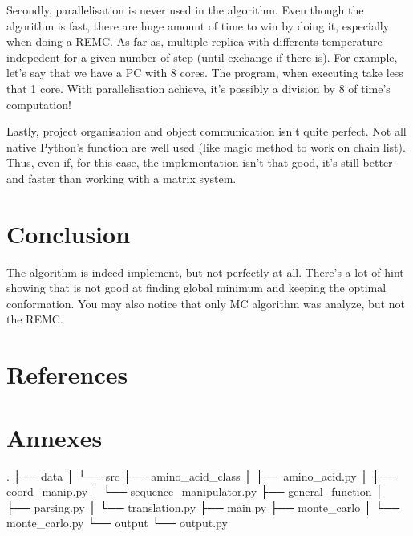 \documentclass[12pt, oneside, a4paper]{report}
\begin{document}
\begin{multicols}{2}
Secondly, parallelisation is never used in the algorithm. Even though the algorithm is fast, there are huge amount of time to win by doing it, especially when doing a REMC. As far as, multiple replica with differents temperature indepedent for a given number of step (until exchange if there is). For example, let's say that we have a PC with 8 cores. The program, when executing take less that 1 core. With parallelisation achieve, it's possibly a division by 8 of time's computation!

Lastly, project organisation and object communication isn't quite perfect. Not all native Python's function are well used (like magic method to work on chain list). Thus, even if, for this case, the implementation isn't that good, it's still better and faster than working with a matrix system.

\section{Conclusion}
The algorithm is indeed implement, but not perfectly at all. There's a lot of hint showing that is not good at finding global minimum and keeping the optimal conformation. You may also notice that only MC algorithm was analyze, but not the REMC. 

\section{References}
\begingroup
    \renewcommand{\chapter}[2]{}%

    
    
\endgroup
\end{multicols}

\pagebreak
\section*{Annexes}
\renewcommand\thefigure{\Roman{figure}}
\setcounter{figure}{0}

\begin{tex}
.
├── data
│
└── src
    ├── amino_acid_class
    │   ├── amino_acid.py
    │   ├── coord_manip.py
    │   └── sequence_manipulator.py
    ├── general_function
    │   ├── parsing.py
    │   └── translation.py
    ├── main.py
    ├── monte_carlo
    │   └── monte_carlo.py
    └── output
        └── output.py
\end{tex}
\end{document}

